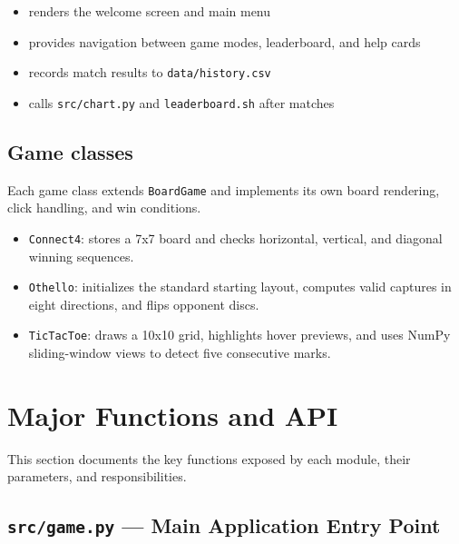\documentclass[12pt,a4paper]{article}
\begin{document}
\begin{itemize}
    \item renders the welcome screen and main menu
    \item provides navigation between game modes, leaderboard, and help cards
    \item records match results to \texttt{data/history.csv}
    \item calls \texttt{src/chart.py} and \texttt{leaderboard.sh} after matches
\end{itemize}

\subsection{Game classes}

Each game class extends \texttt{BoardGame} and implements its own board rendering, click handling, and win conditions.

\begin{itemize}
    \item \texttt{Connect4}: stores a 7x7 board and checks horizontal, vertical, and diagonal winning sequences.
    \item \texttt{Othello}: initializes the standard starting layout, computes valid captures in eight directions, and flips opponent discs.
    \item \texttt{TicTacToe}: draws a 10x10 grid, highlights hover previews, and uses NumPy sliding-window views to detect five consecutive marks.
\end{itemize}

\section{Major Functions and API}

This section documents the key functions exposed by each module, their parameters, and responsibilities.

\subsection{\texttt{src/game.py} — Main Application Entry Point}
\end{document}

